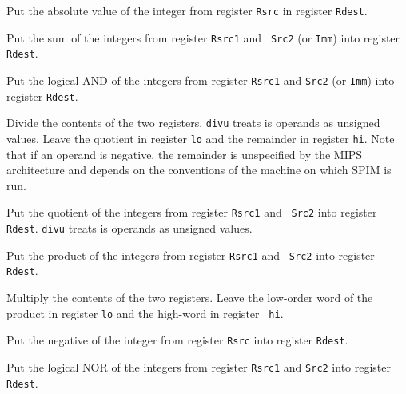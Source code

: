 Put the absolute value of the integer from register {\tt Rsrc} in
register {\tt Rdest}.

Put the sum of the integers from register {\tt Rsrc1} and {\tt
Src2} (or {\tt Imm}) into register {\tt Rdest}.

Put the logical AND of the integers from register {\tt Rsrc1} and
{\tt Src2} (or {\tt Imm}) into register {\tt Rdest}.

Divide the contents of the two registers.
{\tt divu} treats is operands as unsigned values.  Leave the quotient in
register {\tt lo} and the remainder in register {\tt hi}.  Note that
if an operand is negative, the remainder is unspecified by the MIPS
architecture and depends on the conventions of the machine on which
SPIM is run.

Put the quotient of the integers from register {\tt Rsrc1} and {\tt
Src2} into register {\tt Rdest}. {\tt divu} treats is operands as
unsigned values.

Put the product of the integers from register {\tt Rsrc1} and {\tt
Src2} into register {\tt Rdest}.

Multiply the contents of the two registers.  Leave the low-order word
of the product in register {\tt lo} and the high-word in register {\tt
hi}.

Put the negative of the integer from register {\tt Rsrc} into
register {\tt Rdest}.

Put the logical NOR of the integers from register {\tt Rsrc1} and
{\tt Src2} into register {\tt Rdest}.

